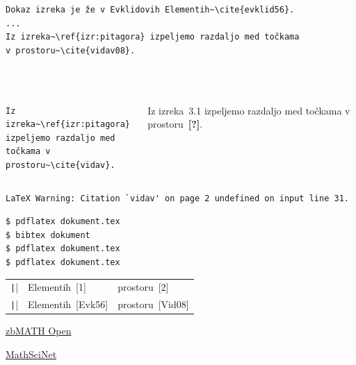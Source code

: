 \documentclass[aspectratio=169]{beamer}
\begin{document}
\begin{frame}[fragile]{}
  \begin{verbatim}
Dokaz izreka je že v Evklidovih Elementih~\cite{evklid56}.
...
Iz izreka~\ref{izr:pitagora} izpeljemo razdaljo med točkama
v prostoru~\cite{vidav08}.



  \end{verbatim}
\end{frame}

\begin{frame}[fragile]{}
  \begin{columns}[T]
    \begin{column}{0.55\textwidth}
      \begin{verbatim}
Iz izreka~\ref{izr:pitagora}
izpeljemo razdaljo med
točkama v prostoru~\cite{vidav}.
      \end{verbatim}
    \end{column}
    \begin{column}{0.4\textwidth}
    Iz izreka~3.1 izpeljemo razdaljo med točkama v prostoru~\textbf{[?]}.
    \end{column}
  \end{columns}
  \bigskip
  \begin{verbatim}
LaTeX Warning: Citation `vidav' on page 2 undefined on input line 31.
  \end{verbatim}
\end{frame}

\begin{frame}[fragile]{}
  \begin{verbatim}
$ pdflatex dokument.tex
$ bibtex dokument
$ pdflatex dokument.tex
$ pdflatex dokument.tex
  \end{verbatim}
\end{frame}

\begin{frame}[fragile]{}
  \begin{tabular}{lll}
    \texttt|| & Elementih~[1] & prostoru~[2] \\
    \texttt|| & Elementih~[Evk56] & prostoru~[Vid08] \\
  \end{tabular}
  \bigskip
\end{frame}

\begin{frame}[fragile]{}
  \begin{center}
    \Large
    \href{https://zbmath.org/}{zbMATH Open \faLockOpen}

    \href{https://mathscinet.ams.org/}{MathSciNet \faLock}
  \end{center}
\end{frame}
\end{document}
